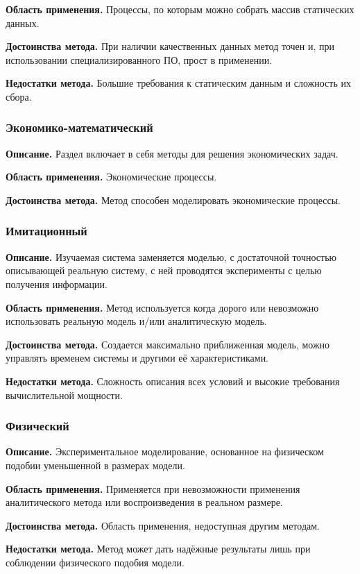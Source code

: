 \textbf{Область применения.} Процессы, по которым можно собрать массив статических данных.

\textbf{Достоинства метода.} При наличии качественных данных метод точен и, при использовании специализированного ПО, прост в применении.

\textbf{Недостатки метода.} Большие требования к статическим данным и сложность их сбора.

\subsubsection*{\textbf{Экономико-математический}}
\textbf{Описание.} Раздел включает в себя методы для решения экономических задач.

\textbf{Область применения.} Экономические процессы.

\textbf{Достоинства метода.} Метод способен моделировать экономические процессы.

\subsubsection*{\textbf{Имитационный}}
\textbf{Описание.} Изучаемая система заменяется моделью, с достаточной точностью описывающей реальную систему, с ней проводятся эксперименты с целью получения информации.

\textbf{Область применения.} Метод используется когда дорого или невозможно использовать реальную модель и/или аналитическую модель.

\textbf{Достоинства метода.} Создается максимально приближенная модель, можно управлять временем системы и другими её характеристиками.

\textbf{Недостатки метода.} Сложность описания всех условий и высокие требования вычислительной мощности.

\subsubsection*{\textbf{Физический}}
\textbf{Описание.} Экспериментальное моделирование, основанное на физическом подобии уменьшенной в размерах модели.

\textbf{Область применения.} Применяется при невозможности применения аналитического метода или воспроизведения в реальном размере.

\textbf{Достоинства метода.} Область применения, недоступная другим методам.

\textbf{Недостатки метода.} Метод может дать надёжные результаты лишь при соблюдении физического подобия модели.

